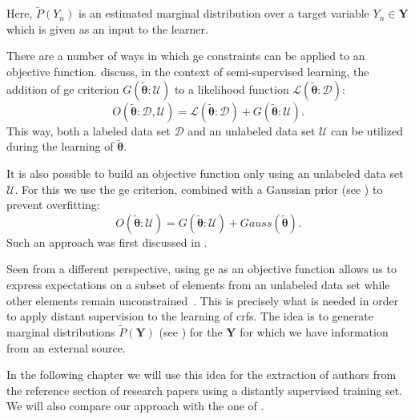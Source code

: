 Here, $\tilde{P}(Y_n)$ is an estimated \gls{marginal distribution} over a \gls{target variable} $Y_n\in\mathbf{Y}$ which is given as an input to the learner.

\bigskip

There are a number of ways in which \gls{ge} constraints can be applied to an \gls{objective function}.
\citet{mann2010generalized} discuss, in the context of semi-supervised learning, the addition of \gls{ge} criterion $G(\bm{\tilde{\theta}}:\mathcal{U})$ to a likelihood function $\mathcal{L}(\bm{\tilde{\theta}}:\mathcal{D})$:
\begin{equation}
  \label{equ:objective-function-l-g}
  O(\bm{\tilde{\theta}}:\mathcal{D},\mathcal{U})=\mathcal{L}(\bm{\tilde{\theta}}:\mathcal{D})+G(\bm{\tilde{\theta}}:\mathcal{U}).
\end{equation}
This way, both a labeled data set $\mathcal{D}$ and an unlabeled data set $\mathcal{U}$ can be utilized during the learning of $\bm{\tilde{\theta}}$.

It is also possible to build an \gls{objective function} only using an unlabeled data set $\mathcal{U}$.
For this we use the \gls{ge} criterion, combined with a Gaussian prior (see ) to prevent overfitting:
\begin{equation}
  \label{equ:objective-function-g}
  O(\bm{\tilde{\theta}}:\mathcal{U})=G(\bm{\tilde{\theta}}:\mathcal{U})+Gauss(\bm{\tilde{\theta}}).
\end{equation}
Such an approach was first discussed in \citet{mann2008generalized}.

Seen from a different perspective, using \gls{ge} as an objective function allows us to express expectations on a subset of elements from an unlabeled data set while other elements remain unconstrained~\citep{mann2010generalized}.
This is precisely what is needed in order to apply \gls{distant supervision} to the learning of \glspl{crf}.
The idea is to generate \glspl{marginal distribution} $\tilde{P}(\mathbf{Y})$ (see ) for the $\mathbf{Y}$ for which we have information from an external source.

In the following chapter we will use this idea for the extraction of authors from the reference section of research papers using a distantly supervised training set.
We will also compare our approach with the one of \citep{lu2013web}.

